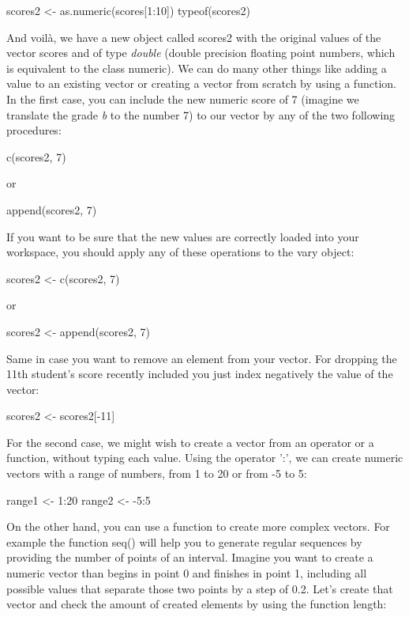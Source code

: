 \begin{exampler}
scores2 <- as.numeric(scores[1:10])
typeof(scores2)
\end{exampler}

And voilà, we have a new object called scores2 with the original values of the vector scores and of type \emph{double} (double precision floating point numbers, which is equivalent to the class numeric).  We can do many other things like adding a value to an existing vector or creating a vector from scratch by using a function. In the first case, you can include the new numeric score of 7 (imagine we translate the grade \emph{b} to the number 7) to our vector by any of the two following procedures:

\begin{exampler}
c(scores2, 7)
\end{exampler}

or

\begin{exampler}
append(scores2, 7)
\end{exampler}

If you want to be sure that the new values are correctly loaded into your workspace, you should apply any of these operations to the vary object:

\begin{exampler}
scores2 <- c(scores2, 7)
\end{exampler}

or

\begin{exampler}
scores2 <- append(scores2, 7)
\end{exampler}

Same in case you want to remove an element from your vector. For dropping the 11th student's score recently included you just index negatively the value of the vector:

\begin{exampler}
scores2 <- scores2[-11]
\end{exampler}

For the second case, we might wish to create a vector from an operator or a function, without typing each value. Using the operator ':', we can create numeric vectors with a range of numbers, from 1 to 20 or from -5 to 5:	

\begin{exampler}
range1 <- 1:20
range2 <- -5:5
\end{exampler}

On the other hand, you can use a function to create more complex vectors. For example the function seq() will help you to generate regular sequences by providing the number of points of an interval.  Imagine you want to create a numeric vector than begins in point 0 and finishes in point 1, including all possible values that separate those two points by a step of 0.2. Let's create that vector and check the amount of created elements by using the function length:

